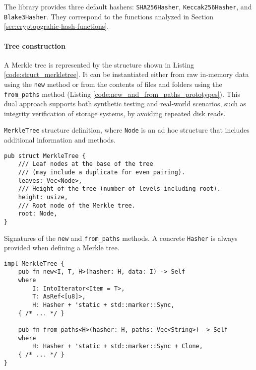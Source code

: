 The library provides three default hashers: \texttt{SHA256Hasher}, \texttt{Keccak256Hasher}, and \texttt{Blake3Hasher}. They correspond to the functions analyzed in Section \ref{sec:cryptopgrahic-hash-functions}. 

\paragraph{Tree construction}
A Merkle tree is represented by the structure shown in Listing \ref{code:struct_merkletree}. It can be instantiated either from raw in-memory data using the \texttt{new} method or from the contents of files and folders using the \texttt{from\_paths} method (Listing \ref{code:new_and_from_paths_prototypes}). This dual approach supports both synthetic testing and real-world scenarios, such as integrity verification of storage systems, by avoiding repeated disk reads.

\begin{listing}[!ht]
\caption{\texttt{MerkleTree} structure definition, where \texttt{Node} is an ad hoc structure that includes additional information and methods.}
\label{code:struct_merkletree}
\begin{verbatim}
pub struct MerkleTree {
    /// Leaf nodes at the base of the tree 
    /// (may include a duplicate for even pairing).
    leaves: Vec<Node>,
    /// Height of the tree (number of levels including root).
    height: usize,
    /// Root node of the Merkle tree.
    root: Node,
}
\end{verbatim}
\end{listing}


\begin{listing}[H]
\caption{Signatures of the \texttt{new} and \texttt{from\_paths} methods. A concrete \texttt{Hasher} is always provided when defining a Merkle tree.}
\label{code:new_and_from_paths_prototypes}
\begin{verbatim}
impl MerkleTree {
    pub fn new<I, T, H>(hasher: H, data: I) -> Self
    where
        I: IntoIterator<Item = T>,
        T: AsRef<[u8]>,
        H: Hasher + 'static + std::marker::Sync,
    { /* ... */ }

    pub fn from_paths<H>(hasher: H, paths: Vec<String>) -> Self
    where
        H: Hasher + 'static + std::marker::Sync + Clone,
    { /* ... */ }
}
\end{verbatim}
\end{listing}

